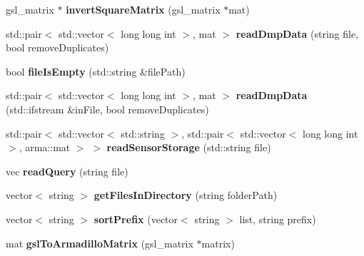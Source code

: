 \begin{DoxyCompactItemize}
\item 
gsl\+\_\+matrix $\ast$ {\bfseries invert\+Square\+Matrix} (gsl\+\_\+matrix $\ast$mat)\hypertarget{namespacekukadu_a26d727537843251062a70a7a4ec9939d}{}\label{namespacekukadu_a26d727537843251062a70a7a4ec9939d}

\item 
std\+::pair$<$ std\+::vector$<$ long long int $>$, mat $>$ {\bfseries read\+Dmp\+Data} (string file, bool remove\+Duplicates)\hypertarget{namespacekukadu_ade07446067000afbbdaaed35026807db}{}\label{namespacekukadu_ade07446067000afbbdaaed35026807db}

\item 
bool {\bfseries file\+Is\+Empty} (std\+::string \&file\+Path)\hypertarget{namespacekukadu_a694a6df4f63608c35803a49bd7399bc4}{}\label{namespacekukadu_a694a6df4f63608c35803a49bd7399bc4}

\item 
std\+::pair$<$ std\+::vector$<$ long long int $>$, mat $>$ {\bfseries read\+Dmp\+Data} (std\+::ifstream \&in\+File, bool remove\+Duplicates)\hypertarget{namespacekukadu_a440c595624bf265e4668c28db0d48d46}{}\label{namespacekukadu_a440c595624bf265e4668c28db0d48d46}

\item 
std\+::pair$<$ std\+::vector$<$ std\+::string $>$, std\+::pair$<$ std\+::vector$<$ long long int $>$, arma\+::mat $>$ $>$ {\bfseries read\+Sensor\+Storage} (std\+::string file)\hypertarget{namespacekukadu_a5c66d95a086a7565c9a72c4102cc25ff}{}\label{namespacekukadu_a5c66d95a086a7565c9a72c4102cc25ff}

\item 
vec {\bfseries read\+Query} (string file)\hypertarget{namespacekukadu_ac3b7339c98a02ebbacff3272fd3aa6e0}{}\label{namespacekukadu_ac3b7339c98a02ebbacff3272fd3aa6e0}

\item 
vector$<$ string $>$ {\bfseries get\+Files\+In\+Directory} (string folder\+Path)\hypertarget{namespacekukadu_a8967b22ed1eec57bc76b687a63ab4a03}{}\label{namespacekukadu_a8967b22ed1eec57bc76b687a63ab4a03}

\item 
vector$<$ string $>$ {\bfseries sort\+Prefix} (vector$<$ string $>$ list, string prefix)\hypertarget{namespacekukadu_a6c32f5b1575bda3fba2fb6aa361e6f71}{}\label{namespacekukadu_a6c32f5b1575bda3fba2fb6aa361e6f71}

\item 
mat {\bfseries gsl\+To\+Armadillo\+Matrix} (gsl\+\_\+matrix $\ast$matrix)\hypertarget{namespacekukadu_affb25d35d5eef5bc7d803a94c0e66739}{}\label{namespacekukadu_affb25d35d5eef5bc7d803a94c0e66739}


\end{DoxyCompactItemize}
